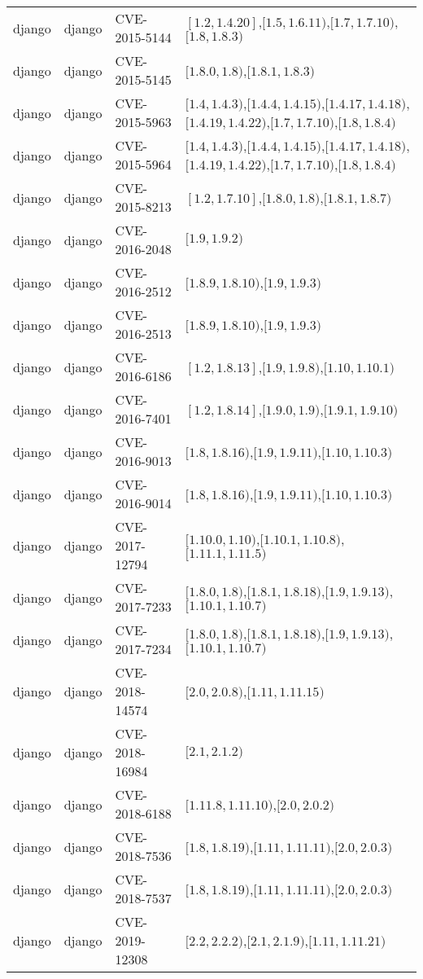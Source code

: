 \begin{tabular}{llll}
django & django & CVE-2015-5144 & $[1.2,1.4.20]$,$[1.5,1.6.11)$,$[1.7,1.7.10)$,$[1.8,1.8.3)$ \\
django & django & CVE-2015-5145 & $[1.8.0,1.8)$,$[1.8.1,1.8.3)$ \\
django & django & CVE-2015-5963 & $[1.4,1.4.3)$,$[1.4.4,1.4.15)$,$[1.4.17,1.4.18)$,$[1.4.19,1.4.22)$,$[1.7,1.7.10)$,$[1.8,1.8.4)$ \\
django & django & CVE-2015-5964 & $[1.4,1.4.3)$,$[1.4.4,1.4.15)$,$[1.4.17,1.4.18)$,$[1.4.19,1.4.22)$,$[1.7,1.7.10)$,$[1.8,1.8.4)$ \\
django & django & CVE-2015-8213 & $[1.2,1.7.10]$,$[1.8.0,1.8)$,$[1.8.1,1.8.7)$ \\
django & django & CVE-2016-2048 & $[1.9,1.9.2)$ \\
django & django & CVE-2016-2512 & $[1.8.9,1.8.10)$,$[1.9,1.9.3)$ \\
django & django & CVE-2016-2513 & $[1.8.9,1.8.10)$,$[1.9,1.9.3)$ \\
django & django & CVE-2016-6186 & $[1.2,1.8.13]$,$[1.9,1.9.8)$,$[1.10,1.10.1)$ \\
django & django & CVE-2016-7401 & $[1.2,1.8.14]$,$[1.9.0,1.9)$,$[1.9.1,1.9.10)$ \\
django & django & CVE-2016-9013 & $[1.8,1.8.16)$,$[1.9,1.9.11)$,$[1.10,1.10.3)$ \\
django & django & CVE-2016-9014 & $[1.8,1.8.16)$,$[1.9,1.9.11)$,$[1.10,1.10.3)$ \\
django & django & CVE-2017-12794 & $[1.10.0,1.10)$,$[1.10.1,1.10.8)$,$[1.11.1,1.11.5)$ \\
django & django & CVE-2017-7233 & $[1.8.0,1.8)$,$[1.8.1,1.8.18)$,$[1.9,1.9.13)$,$[1.10.1,1.10.7)$ \\
django & django & CVE-2017-7234 & $[1.8.0,1.8)$,$[1.8.1,1.8.18)$,$[1.9,1.9.13)$,$[1.10.1,1.10.7)$ \\
django & django & CVE-2018-14574 & $[2.0,2.0.8)$,$[1.11,1.11.15)$ \\
django & django & CVE-2018-16984 & $[2.1,2.1.2)$ \\
django & django & CVE-2018-6188 & $[1.11.8,1.11.10)$,$[2.0,2.0.2)$ \\
django & django & CVE-2018-7536 & $[1.8,1.8.19)$,$[1.11,1.11.11)$,$[2.0,2.0.3)$ \\
django & django & CVE-2018-7537 & $[1.8,1.8.19)$,$[1.11,1.11.11)$,$[2.0,2.0.3)$ \\
django & django & CVE-2019-12308 & $[2.2,2.2.2)$,$[2.1,2.1.9)$,$[1.11,1.11.21)$ \\

\end{tabular}
